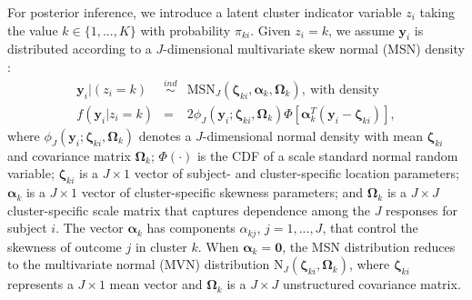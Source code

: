 \documentclass[useAMS,usenatbib,referee]{biom}
\begin{document}
For posterior inference, we introduce a latent cluster indicator variable $z_i$ taking the value $k \in \{1,...,K\}$ with probability $\pi_{ki}$. Given $z_i = k$, we assume $\mathbf{y}_{i}$ is distributed according to a $J$-dimensional multivariate skew normal (MSN) density \citep{azzalini1996multivariate}:
\begin{eqnarray}
\mathbf{y}_{i}|(z_i=k) &\stackrel{ind}{\sim}& \text{MSN}_J(\boldsymbol\zeta_{ki},\boldsymbol\alpha_k,\boldsymbol\Omega_k), ~\text{with density} \label{eq:msndens}\nonumber\\
f(\mathbf{y}_i|z_i=k) &=& 2\phi_J(\mathbf{y}_i;\boldsymbol\zeta_{ki},\boldsymbol\Omega_k)\Phi[\boldsymbol\alpha^T_k(\mathbf{y}_i-\boldsymbol\zeta_{ki})],
\end{eqnarray}
where $\phi_J(\mathbf{y}_i;\boldsymbol\zeta_{ki},\boldsymbol\Omega_k)$ denotes a $J$-dimensional normal density with mean $\boldsymbol\zeta_{ki}$ and covariance matrix $\boldsymbol\Omega_k$; $\Phi(\cdot)$ is the CDF of a scale standard normal random variable; $\boldsymbol\zeta_{ki}$ is a $J \times 1$ vector of subject- and cluster-specific location parameters; $\boldsymbol\alpha_k$ is a $J \times 1$ vector of cluster-specific skewness parameters; and $\boldsymbol\Omega_k$ is a $J \times J$ cluster-specific scale matrix that captures dependence among the $J$ responses for subject $i$. The vector $\boldsymbol\alpha_k$ has components $\alpha_{kj}$, $j = 1,...,J$, that control the skewness of outcome $j$ in cluster $k$. When $\boldsymbol\alpha_k = \mathbf{0}$, the MSN distribution reduces to the multivariate normal (MVN) distribution $\text{N}_J(\boldsymbol\zeta_{ki},\boldsymbol\Omega_k)$, where $\boldsymbol\zeta_{ki}$ represents a $J \times 1$ mean vector and $\boldsymbol\Omega_k$ is a $J \times J$ unstructured covariance matrix.
\end{document}
